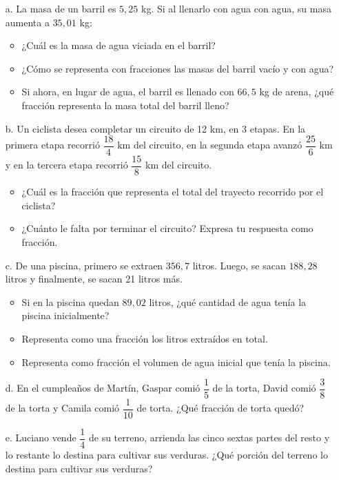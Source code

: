 \documentclass[spanish,letterpaper, 11pt, addpoints, answers]{exam}
\begin{document}
\begin{questions}
\begin{itemize}
  \item[a.] La masa de un barril es $5{,}25$ kg. Si al llenarlo con agua con agua, su masa aumenta a $35{,}01$ kg:
  \begin{itemize}
    \item ¿Cuál es la masa de agua viciada en el barril?
    \item ¿Cómo se representa con fracciones las masas del barril vacío y con agua?
    \item Si ahora, en lugar de agua, el barril es llenado con $66{,}5$ kg de arena, ¿qué fracción representa la masa total del barril lleno?
  \end{itemize}
  \item[b.] Un ciclista desea completar un circuito de 12 km, en 3 etapas. En la primera etapa recorrió $\dfrac{18}{4}$ km del circuito, en la segunda etapa avanzó $\dfrac{25}{6}$ km y en la tercera etapa recorrió $\dfrac{15}{8}$ km del circuito.
  \begin{itemize}
    \item ¿Cuál es la fracción que representa el total del trayecto recorrido por el ciclista?
    \item ¿Cuánto le falta por terminar el circuito? Expresa tu respuesta como fracción.
  \end{itemize}
  \item[c.] De una piscina, primero se extraen $356{,}7$ litros. Luego, se sacan $188{,}28$ litros y finalmente, se sacan 21 litros más.
  \begin{itemize}
    \item Si en la piscina quedan $89{,}02$ litros, ¿qué cantidad de agua tenía la piscina inicialmente?
    \item Representa como una fracción los litros extraídos en total.
    \item Representa como fracción el volumen de agua inicial que tenía la piscina.
  \end{itemize}
  \item[d.] En el cumpleaños de Martín, Gaspar comió $\dfrac{1}{5}$ de la torta, David comió $\dfrac{3}{8}$ de la torta y Camila comió $\dfrac{1}{10}$ de torta. ¿Qué fracción de torta quedó?
  \item[e.] Luciano vende $\dfrac{1}{4}$ de su terreno, arrienda las cinco sextas partes del resto y lo restante lo destina para cultivar sus verduras. ¿Qué porción del terreno lo destina para cultivar sus verduras?
\end{itemize}


\end{questions}
\end{document}
